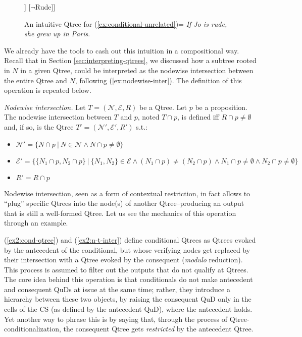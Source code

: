 \begin{figure}[H]
	\centering
	\begin{forest}
		[CS [Rude [Paris][Lyon][...][Berlin][...]] [$\neg$Rude]]
	\end{forest}
	\caption{An intuitive Qtree for (\ref{ex:conditional-unrelated})= \textit{If Jo is rude, she grew up in Paris}.}\label{fig:rude-paris-qtree}
\end{figure} 

We already have the tools to cash out this intuition in a compositional way. Recall that in Section \ref{sec:interpreting-qtrees}, we discussed how a subtree rooted in $N$ in a given Qtree, could be interpreted as the nodewise intersection between the entire Qtree and $N$, following (\ref{ex:nodewise-inter}). The definition of this operation is repeated below.

\begin{exe}
	 {\textit{Nodewise intersection.} Let $T=(\mathcal{N}, \mathcal{E}, R)$ be a Qtree. Let $p$ be a proposition. The nodewise intersection between $T$ and $p$, noted $T \cap p$, is defined iff $R \cap p \neq \emptyset$ and, if so, is the Qtree $T'=(\mathcal{N}', \mathcal{E}', R')$ s.t.:
		\begin{itemize}
			\item $\mathcal{N}' = \lbrace N \cap p \ | \ N \in \mathcal{N} \wedge N \cap p \neq \emptyset\rbrace$
			\item $\mathcal{E}' = \lbrace \lbrace N_1\cap p, N_2\cap p\rbrace \ | \ \lbrace N_1, N_2\rbrace \in \mathcal{E} \wedge (N_1\cap p) \neq (N_2\cap p) \wedge N_1\cap p \neq \emptyset \wedge N_2\cap p \neq \emptyset \rbrace$
			\item $R' = R\cap p$
	\end{itemize}}
\end{exe} 

Nodewise intersection, seen as a form of contextual restriction, in fact allows to ``plug'' specific Qtrees into the node(s) of another Qtree--producing an output that is still a well-formed Qtree. Let us see the mechanics of this operation through an example.




(\ref{ex2:cond-qtree}) and (\ref{ex2:n-t-inter}) define conditional Qtrees as Qtrees evoked by the antecedent of the conditional, but whose verifying nodes get replaced by their intersection with a Qtree evoked by the consequent (\textit{modulo} reduction). This process is assumed to filter out the outputs that do not qualify at Qtrees. The core idea behind this operation is that conditionals do not make antecedent and consequent QuDs at issue at the same time; rather, they introduce a hierarchy between these two objects, by raising the consequent QuD only in the cells of the CS (as defined by the antecedent QuD), where the antecedent holds. Yet another way to phrase this is by saying that, through the process of Qtree-conditionalization, the consequent Qtree gets \textit{restricted} by the antecedent Qtree.

